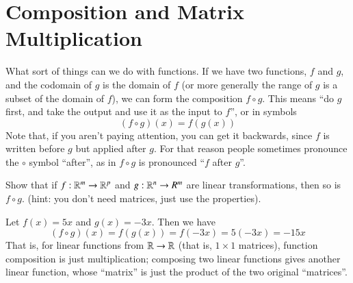 \exersisesn

\section{Composition and Matrix Multiplication}

\label{sec:matmultsec}

What sort of things can we do with functions.
If we have two functions, $f$ and $g$, and the codomain of $g$ is the domain of $f$ (or more generally the range of $g$ is a subset of the domain of $f$), we can form the composition $f\circ g$.  
This means ``do $g$ first, and take the output and use it as the input to $f$'', or in symbols
\[(f\circ g)(x) = f(g(x))\]
Note that, if you aren't paying attention, you can get it backwards, since $f$ is written before $g$ but applied after $g$.
For that reason people sometimes pronounce the $\circ$ symbol ``after'', as in $f\circ g$ is pronounced ``$f$ after $g$''.  

\begin{Ex}
  Show that if $f:\mathbb{R}^m\to \mathbb{R}^p$ and $g:\mathbb{R}^n\to R^m$ are linear transformations, then so is $f\circ g$.  (hint: you don't need matrices, just use the properties).
\end{Ex}

Let $f(x) = 5x$ and $g(x)=-3x$.
Then we have
\[(f\circ g)(x) = f(g(x)) = f(-3x) = 5(-3x) = -15x\]
That is, for linear functions from $\mathbb{R}\to \mathbb{R}$ (that is, $1\times 1$ matrices), function composition is just multiplication; composing two linear functions gives another linear function, whose ``matrix'' is just the product of the two original ``matrices''.  

